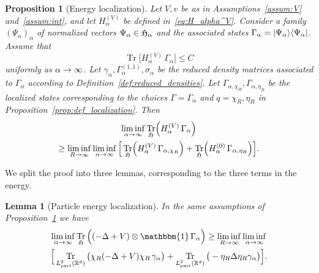 \documentclass[10pt]{amsart}
\newtheorem{lemm}[theo]{Lemma}\newtheorem{prop}[theo]{Proposition}\newtheorem{coro}[theo]{Corollary}\newtheorem{conj}[theo]{Conjecture}
\theoremstyle{definition}\newtheorem{defi}[theo]{Definition}\newtheorem{rema}[theo]{Remark}\newtheorem{exam}[theo]{Example}\newtheorem{exem}[theo]{Example}\newtheorem{nota}[theo]{Notation}
\newcommand{\bra}[1]{\left\langle #1\right|}
\newcommand{\ket}[1]{\left|#1\right\rangle}
\DeclareMathOperator{\Tr}{Tr}
\DeclareMathOperator{\partt}{part}
\newcommand{\R}{\mathbb{R}}
\newcommand{\gH}{\mathfrak{H}}
\newcommand{\1}{\mathds{1}}
\let\oldin\in
\renewcommand{\in}{\mathchoice{\oldin}{\oldin}{\,\oldin\,}{\,\oldin\,}}
\renewcommand*{\to}{\mathchoice{\longrightarrow}{\rightarrow}{\rightarrow}{\rightarrow}}
\let\originalleft\left
\let\originalright\right
\renewcommand{\left}{\mathopen{}\mathclose\bgroup\originalleft}
\renewcommand{\right}{\aftergroup\egroup\originalright}
\begin{document}
\begin{prop}[{Energy localization}]\label{prop:localization}
Let $V,v$ be as in Assumptions~\ref{assum:V} and~\ref{assum:int}, and let $H_\alpha^{(V)}$ be defined in~\eqref{eq:H_alpha^V}. Consider a family $(\Psi_\alpha)_{\alpha}$ of normalized vectors $\Psi_{\alpha}\in  \gH_{\alpha}$ and the associated states $\Gamma_\alpha=\ket{\Psi_\alpha}\bra{\Psi_\alpha}$. Assume that
\begin{equation*}
\Tr\big[H_\alpha^{(V)}\, \Gamma_\alpha\big]\le C
\end{equation*}
uniformly as $\alpha\to\infty$. Let $\gamma_\alpha,\Gamma_\alpha^{(1,1)},\sigma_\alpha$ be the reduced density matrices associated to $\Gamma_\alpha$ according to Definition~\ref{def:reduced_densities}. Let $\Gamma_{\alpha,\chi_R},\Gamma_{\alpha,\eta_R}$ be the localized states corresponding to the choices $\Gamma=\Gamma_\alpha$ and $q=\chi_R,\eta_R$ in Proposition~\ref{prop:def_localization}. Then
\begin{multline}\label{eq:full_energy_localization}
\liminf_{\alpha\to\infty} \Tr_{ \gH}\left(H_\alpha^{(V)}\, \Gamma_\alpha\right) \\
\ge \liminf_{R\to\infty} \liminf_{\alpha\to\infty} \Big[\Tr_{ \gH}\left(H_\alpha^{(V)}\, \Gamma_{\alpha,\chi_R}\right) + \Tr_{ \gH}\left(H_\alpha^{(0)}\, \Gamma_{\alpha,\eta_R}\right)\Big].
\end{multline}
\end{prop}

We split the proof into three lemmas, corresponding to the three terms in the energy.

\begin{lemm}[{Particle energy localization}]\label{lemma:part_localization}
In the same assumptions of Proposition~\ref{prop:localization} we have
\begin{multline}\label{eq:splitting_particle}
\liminf_{\alpha\to\infty} \Tr_{ \gH}\Big((-\Delta+V)\otimes \mathbbm{1}\,\Gamma_\alpha\Big)
\ge \liminf_{R \to\infty} \liminf_{\alpha\to\infty}\\\Big[\Tr_{L^2_{\partt}(\R^d)}\big(\chi_R (-\Delta+V)\chi_R\,\gamma_\alpha\big)
+ \Tr_{L^2_{\partt}(\R^d)}\big(-\eta_R\Delta\eta_R \gamma_\alpha\big) \Big].
\end{multline}
\end{lemm}
\end{document}
